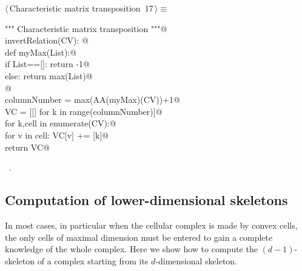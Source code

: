 \documentclass[11pt,oneside]{article}    %
\begin{document}
\begin{flushleft} \small \label{scrap27}
\protect{}$\langle\,$Characteristic matrix transposition\nobreak\ {\footnotesize 17}$\,\rangle\equiv$
\vspace{-1ex}
\begin{list}{}{} \item
\mbox{}\verb@""" Characteristic matrix transposition """@\\
\mbox{}\verb@def invertRelation(CV):    @\\
\mbox{}\verb@    def myMax(List):@\\
\mbox{}\verb@        if List==[]:  return -1@\\
\mbox{}\verb@        else:  return max(List)@\\
\mbox{}\verb@            @\\
\mbox{}\verb@    columnNumber = max(AA(myMax)(CV))+1@\\
\mbox{}\verb@    VC = [[] for k in range(columnNumber)]@\\
\mbox{}\verb@    for k,cell in enumerate(CV):@\\
\mbox{}\verb@        for v in cell: VC[v] += [k]@\\
\mbox{}\verb@    return VC@\\
\mbox{}\verb@@{\NWsep}
\end{list}
\vspace{-1ex}
\footnotesize\addtolength{\baselineskip}{-1ex}
\begin{list}{}{\setlength{\itemsep}{-\parsep}\setlength{\itemindent}{-\leftmargin}}
\item \NWtxtMacroRefIn\ .
\end{list}
\end{flushleft}


\subsection{Computation of lower-dimensional skeletons}

In most cases, in particular when the cellular complex is made by convex cells, the only cells of maximal dimension must be entered to gain a complete knowledge of the whole complex.
Here we show how to compute the $(d-1)$-skeleton of a complex starting from its $d$-dimensional skeleton.
\end{document}
